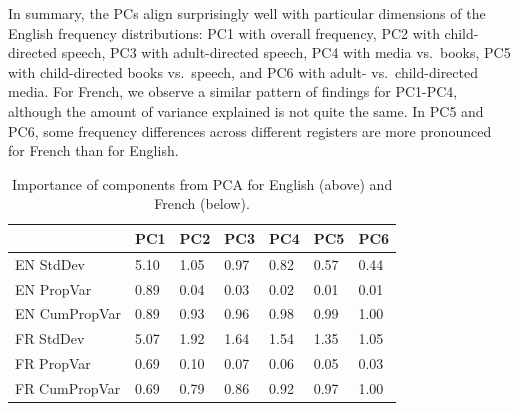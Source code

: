 \documentclass[10pt, letterpaper]{article}
\newenvironment{CodeChunk}{}{}
\begin{document}
In summary, the PCs align surprisingly well with particular dimensions
of the English frequency distributions: PC1 with overall frequency, PC2
with child-directed speech, PC3 with adult-directed speech, PC4 with
media vs.~books, PC5 with child-directed books vs.~speech, and PC6 with
adult- vs.~child-directed media. For French, we observe a similar
pattern of findings for PC1-PC4, although the amount of variance
explained is not quite the same. In PC5 and PC6, some frequency
differences across different registers are more pronounced for French
than for English.

\begin{CodeChunk}



\begin{table}[h]

\begin{center}
\begin{threeparttable}

\caption{\label{tab:pca-table}Importance of components from PCA for English (above) and French (below).}

\begin{tabular}{lllllll}
\toprule
 & \multicolumn{1}{c}{PC1} & \multicolumn{1}{c}{PC2} & \multicolumn{1}{c}{PC3} & \multicolumn{1}{c}{PC4} & \multicolumn{1}{c}{PC5} & \multicolumn{1}{c}{PC6}\\
\midrule
EN StdDev & 5.10 & 1.05 & 0.97 & 0.82 & 0.57 & 0.44\\
EN PropVar & 0.89 & 0.04 & 0.03 & 0.02 & 0.01 & 0.01\\
EN CumPropVar & 0.89 & 0.93 & 0.96 & 0.98 & 0.99 & 1.00\\
FR StdDev & 5.07 & 1.92 & 1.64 & 1.54 & 1.35 & 1.05\\
FR PropVar & 0.69 & 0.10 & 0.07 & 0.06 & 0.05 & 0.03\\
FR CumPropVar & 0.69 & 0.79 & 0.86 & 0.92 & 0.97 & 1.00\\
\bottomrule
\end{tabular}

\end{threeparttable}
\end{center}

\end{table}


\end{CodeChunk}
\end{document}

